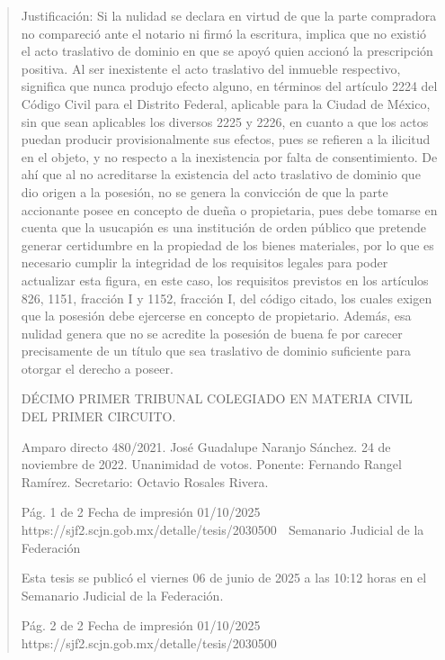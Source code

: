 \documentclass[11pt,a4paper]{article}
\begin{document}
\begin{quote}
Justificación: Si la nulidad se declara en virtud de que la parte compradora no compareció ante el
notario ni firmó la escritura, implica que no existió el acto traslativo de dominio en que se apoyó
quien accionó la prescripción positiva. Al ser inexistente el acto traslativo del inmueble respectivo,
significa que nunca produjo efecto alguno, en términos del artículo 2224 del Código Civil para el
Distrito Federal, aplicable para la Ciudad de México, sin que sean aplicables los diversos 2225 y
2226, en cuanto a que los actos puedan producir provisionalmente sus efectos, pues se refieren a la
ilicitud en el objeto, y no respecto a la inexistencia por falta de consentimiento. De ahí que al no
acreditarse la existencia del acto traslativo de dominio que dio origen a la posesión, no se genera la
convicción de que la parte accionante posee en concepto de dueña o propietaria, pues debe
tomarse en cuenta que la usucapión es una institución de orden público que pretende generar
certidumbre en la propiedad de los bienes materiales, por lo que es necesario cumplir la integridad
de los requisitos legales para poder actualizar esta figura, en este caso, los requisitos previstos en
los artículos 826, 1151, fracción I y 1152, fracción I, del código citado, los cuales exigen que la
posesión debe ejercerse en concepto de propietario. Además, esa nulidad genera que no se
acredite la posesión de buena fe por carecer precisamente de un título que sea traslativo de dominio
suficiente para otorgar el derecho a poseer.

DÉCIMO PRIMER TRIBUNAL COLEGIADO EN MATERIA CIVIL DEL PRIMER CIRCUITO.


Amparo directo 480/2021. José Guadalupe Naranjo Sánchez. 24 de noviembre de 2022.
Unanimidad de votos. Ponente: Fernando Rangel Ramírez. Secretario: Octavio Rosales Rivera.




                                              Pág. 1 de 2              Fecha de impresión 01/10/2025
  https://sjf2.scjn.gob.mx/detalle/tesis/2030500
                                                   Semanario Judicial de la Federación


Esta tesis se publicó el viernes 06 de junio de 2025 a las 10:12 horas en el Semanario Judicial de la
Federación.




                                              Pág. 2 de 2            Fecha de impresión 01/10/2025
  https://sjf2.scjn.gob.mx/detalle/tesis/2030500

\end{quote}
\end{document}
